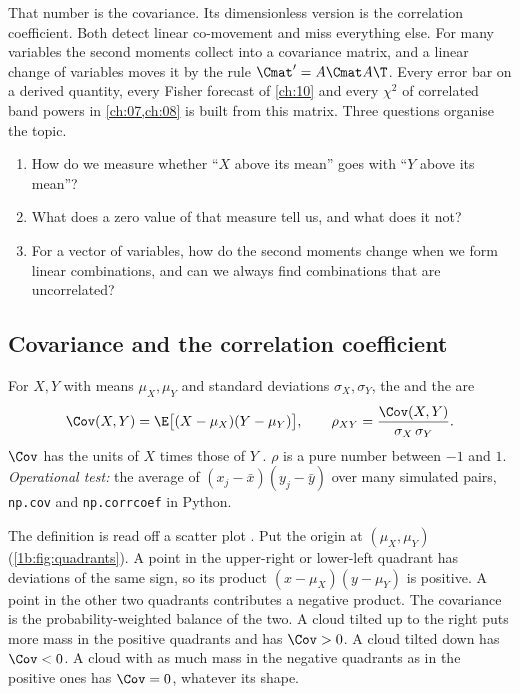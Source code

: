 That number is the covariance. Its dimensionless version is the correlation
coefficient. Both detect linear co-movement and miss everything else. For
many variables the second moments collect into a covariance matrix, and a
linear change of variables moves it by the rule $\Cmat'=A\Cmat A\T$. Every
error bar on a derived quantity, every Fisher forecast of \cref{ch:10} and
every $\chi^2$ of correlated band powers in \cref{ch:07,ch:08} is built from
this matrix. Three questions organise the topic.
\begin{enumerate}[leftmargin=1.6em,itemsep=1pt]
  \item How do we measure whether ``$X$ above its mean'' goes with ``$Y$ above
        its mean''?
  \item What does a zero value of that measure tell us, and what does it not?
  \item For a vector of variables, how do the second moments change when we
        form linear combinations, and can we always find combinations that are
        uncorrelated?
\end{enumerate}

\subsection{Covariance and the correlation coefficient}

\begin{workdef}
For $X,Y$ with means $\mu_X,\mu_Y$ and standard deviations $\sigma_X,\sigma_Y$,
the  and the  are
\begin{equation}
  \Cov(X,Y)=\E\bigl[(X-\mu_X)(Y-\mu_Y)\bigr],\qquad
  \rho_{XY}=\frac{\Cov(X,Y)}{\sigma_X\,\sigma_Y} .
  \label{1b:eq:cov}
\end{equation}
$\Cov$ has the units of $X$ times those of $Y$ . $\rho$ is a pure number between
$-1$ and $1$.
\emph{Operational test:} the average of $(x_j-\bar x)(y_j-\bar y)$ over many
simulated pairs, \texttt{np.cov} and \texttt{np.corrcoef} in Python.
\end{workdef}

The definition is read off a scatter plot . Put the
origin at $(\mu_X,\mu_Y)$ (\cref{1b:fig:quadrants}). A point in the upper-right
or lower-left quadrant has deviations of the same sign, so its product
$(x-\mu_X)(y-\mu_Y)$ is positive. A point in the other two quadrants
contributes a negative product. The covariance is the probability-weighted
balance of the two. A cloud tilted up to the right puts more mass in the
positive quadrants and has $\Cov>0$. A cloud tilted down has $\Cov<0$. A cloud
with as much mass in the negative quadrants as in the positive ones has
$\Cov=0$, whatever its shape.

